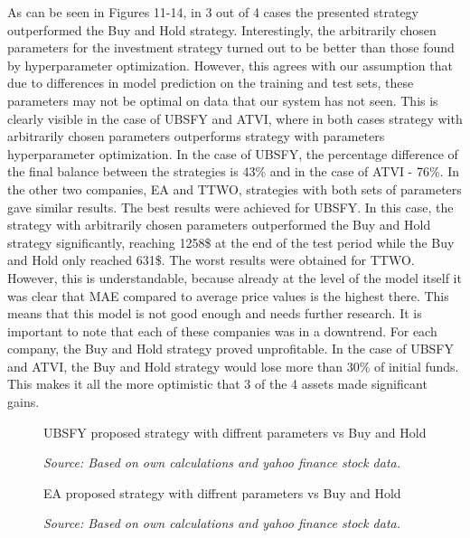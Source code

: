 \documentclass[review]{elsarticle} %
\begin{document}
	 As can be seen in Figures 11-14, in 3 out of 4 cases the presented strategy outperformed the Buy and Hold strategy. Interestingly, the arbitrarily chosen parameters for the investment strategy turned out to be better than those found by hyperparameter optimization. However, this agrees with our assumption that due to differences in model prediction on the training and test sets, these parameters may not be optimal on data that our system has not seen. This is clearly visible in the case of UBSFY and ATVI, where in both cases strategy with arbitrarily chosen parameters outperforms strategy with parameters hyperparameter optimization. In the case of UBSFY, the percentage difference of the final balance between the strategies is 43\% and in the case of ATVI - 76\%. In the other two companies, EA and TTWO, strategies with both sets of parameters gave similar results. The best results were achieved for UBSFY. In this case, the strategy with arbitrarily chosen parameters outperformed the Buy and Hold strategy significantly, reaching 1258\$ at the end of the test period while the Buy and Hold only reached 631\$. The worst results were obtained for TTWO. However, this is understandable, because already at the level of the model itself it was clear that MAE compared to average price values is the highest there. This means that this model is not good enough and needs further research. It is important to note that each of these companies was in a downtrend. For each company, the Buy and Hold strategy proved unprofitable. In the case of UBSFY and ATVI, the Buy and Hold strategy would lose more than 30\% of initial funds. This makes it all the more optimistic that 3 of the 4 assets made significant gains. 

\begin{figure}[H]
\caption{UBSFY proposed strategy with diffrent parameters vs Buy and Hold}
\begin{adjustbox}{width=1.3\textwidth,center}

\end{adjustbox}
\caption*{\textit{Source: Based on own calculations and yahoo finance stock data.}}
\end{figure}

\begin{figure}[H]
\caption{EA proposed strategy with diffrent parameters vs Buy and Hold}
\begin{adjustbox}{width=1.3\textwidth,center}

\end{adjustbox}
\caption*{\textit{Source: Based on own calculations and yahoo finance stock data.}}
\end{figure}
\end{document}
